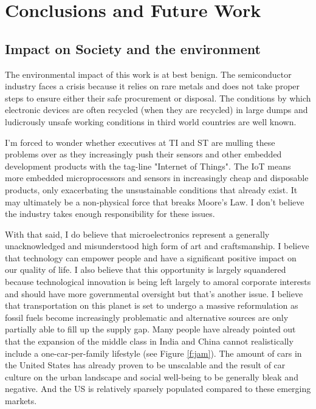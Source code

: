 
\chapter{Conclusions and Future Work} %

\label{Chapter6} %


\section{Impact	on	Society	and	the	environment}

	The environmental impact of this work is at best benign. The semiconductor industry faces a crisis because it relies on rare metals and does not take proper steps to ensure either their safe procurement or disposal. The conditions by which electronic devices are often recycled (when they are recycled) in large dumps and ludicrously unsafe working conditions in third world countries are well known. 
	
	I'm forced to wonder whether executives at TI and ST are mulling these problems over as they increasingly push their sensors and other embedded development products with the tag-line "Internet of Things". The IoT means more embedded microprocessors and sensors in increasingly cheap and disposable products, only exacerbating the unsustainable conditions that already exist. It may ultimately be a non-physical force that breaks Moore's Law. I don't believe the industry takes enough responsibility for these issues.
	
	With that said, I do believe that microelectronics represent a generally unacknowledged and misunderstood high form of art and craftsmanship. I believe that technology can empower people and have a significant positive impact on our quality of life. I also believe that this opportunity is largely squandered because technological innovation is being left largely to amoral corporate interests and should have more governmental oversight but that's another issue. I believe that transportation on this planet is set to undergo a massive reformulation as fossil fuels become increasingly problematic and alternative sources are only partially able to fill up the supply gap. Many people have already pointed out that the expansion of the middle class in India and China cannot realistically include a one-car-per-family lifestyle (see Figure \ref{f:jam}\cite{beij_traffic}). The amount of cars in the United States has already proven to be unscalable and the result of car culture on the urban landscape and social well-being to be generally bleak and negative. And the US is relatively sparsely populated compared to these emerging markets.
	
